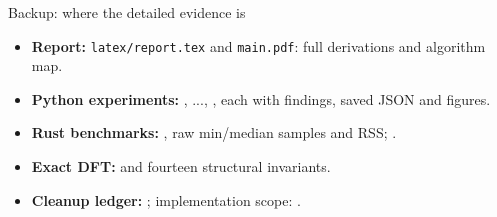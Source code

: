 \documentclass[aspectratio=169,11pt]{beamer}
\begin{document}
\begin{frame}{Backup: where the detailed evidence is}
\begin{itemize}
 \item \textbf{Report:} \texttt{latex/report.tex} and \texttt{main.pdf}: full derivations and algorithm map.
 \item \textbf{Python experiments:} , ..., , each with findings, saved JSON and figures.
 \item \textbf{Rust benchmarks:} , raw min/median samples and RSS; .
 \item \textbf{Exact DFT:}  and fourteen structural invariants.
 \item \textbf{Cleanup ledger:} ; implementation scope: .
\end{itemize}
\end{frame}
\end{document}
